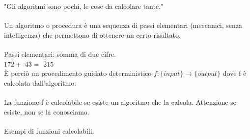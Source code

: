 \documentclass[10pt,a4paper]{book}
\begin{document}
"Gli algoritmi sono pochi, le cose da calcolare tante."\\\\
\noindent
Un algoritmo o procedura \`e una sequenza di passi elementari (meccanici, senza intelligenza) che permettono di ottenere un certo risultato.\\\\
Passi elementari: somma di due cifre.\\
$1	7	2	+$ 
$	4	3	=$ 
$2	1	5$ 
\\
\`E perci\`o un procedimento guidato deterministico $f:\{input\} \longrightarrow \{output\}$ dove f \`e calcolata dall'algoritmo.\\\\
La funzione f \`e calcolabile se esiste un algoritmo che la calcola. Attenzione se esiste, non se la conosciamo.\\\\
Esempi di funzioni calcolabili:
\end{document}
